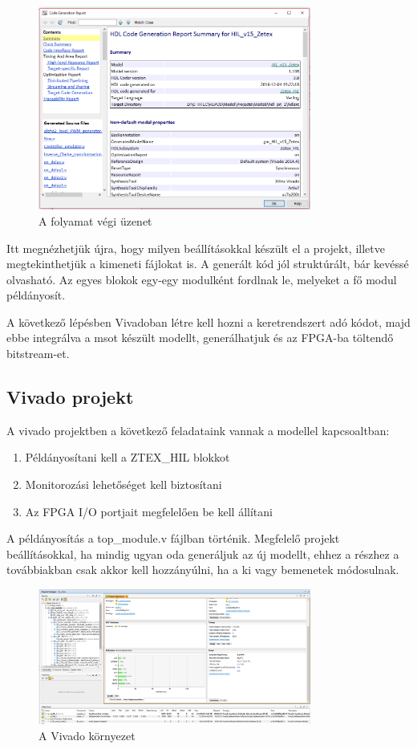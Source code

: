 \begin{figure}[h!]
	\centering
	\includegraphics[width = 0.8\textwidth]{figures/hdl_report.png}
	\caption{A folyamat végi üzenet} 
	\label{fig:hdl_report}
\end{figure}

Itt megnézhetjük újra, hogy milyen beállításokkal készült el a projekt, illetve megtekinthetjük a kimeneti fájlokat is. A generált kód jól struktúrált, bár kevéssé olvasható. Az egyes blokok egy-egy modulként fordlnak le, melyeket a fő modul példányosít.

A következő lépésben Vivadoban létre kell hozni a keretrendszert adó kódot, majd ebbe integrálva a msot készült modellt, generálhatjuk és az FPGA-ba töltendő bitstream-et.

\subsection{Vivado projekt}

A vivado projektben a következő feladataink vannak a modellel kapcsoaltban:
\begin{enumerate}
	\item{Példányosítani kell a ZTEX\_HIL blokkot}
	\item{Monitorozási lehetőséget kell biztosítani}
	\item{Az FPGA I/O portjait megfelelően be kell állítani}
\end{enumerate}

A példányosítás a top\_module.v fájlban történik. Megfelelő projekt beállításokkal, ha mindig ugyan oda generáljuk az új modellt, ehhez a részhez a továbbiakban csak akkor kell hozzányúlni, ha a ki vagy bemenetek módosulnak.

\begin{figure}[H]
	\centering
	\includegraphics[width = 0.8\textwidth]{figures/vivado.png}
	\caption{A Vivado környezet} 
	\label{fig:hdl_report}
\end{figure}

